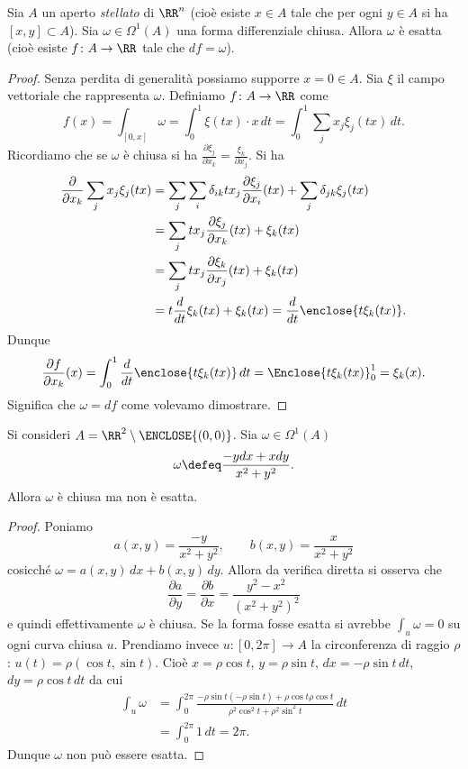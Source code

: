 \begin{theorem}
    \label{th:lemma-poincare}
Sia $A$ un aperto \emph{stellato} di $\RR^n$
(cioè esiste $x\in A$ tale che per ogni $y\in A$ si ha $[x,y]\subset A$). 
Sia $\omega\in \Omega^1(A)$ una forma differenziale chiusa.
Allora $\omega$ è esatta 
(cioè esiste $f\colon A\to \RR$ tale che $df = \omega$).
\end{theorem}
%
\begin{proof}
Senza perdita di generalità possiamo supporre $x=0 \in A$.
Sia $\xi$ il campo vettoriale che rappresenta $\omega$.
Definiamo $f\colon A\to\RR$ come
\[
   f(x) = \int_{[0,x]} \omega = \int_0^1 \xi(tx)\cdot x\, dt 
   = \int_0^1 \sum_j x_j \xi_j(tx) \, dt.
\]
Ricordiamo che se $\omega$ è chiusa si ha $\frac{\partial \xi_j}{\partial x_k} = \frac{\xi_k}{\partial x_j}$.
Si ha 
\begin{align*}
 \frac{\partial}
 {\partial x_k}\sum_j x_j \xi_j(tx)
 &=  \sum_j \sum_i \delta_{ik} t x_j \frac{\partial \xi_j}{\partial x_i}(tx)
    + \sum_j \delta_{jk} \xi_j(tx)\\
 &= \sum_j t x_j \frac{\partial \xi_j}{\partial x_k}(tx) + \xi_k(tx)\\
 &= \sum_j t x_j \frac{\partial \xi_k}{\partial x_j}(tx) + \xi_k(tx)\\
 &= t \frac{d}{dt} \xi_k(tx) + \xi_k(tx) 
  = \frac{d}{dt} \enclose{t \xi_k(tx)}. 
\end{align*}
Dunque 
\[
 \frac{\partial f}{\partial x_k}(x) = \int_0^1 \frac{d}{dt} \enclose{t\xi_k(tx)}\, dt 
 = \Enclose{t\xi_k(tx)}_0^1 = \xi_k(x).
\]
Significa che $\omega = df$ come volevamo dimostrare.
\end{proof}


\begin{example}
Si consideri $A=\RR^2\setminus\ENCLOSE{(0,0)}$.
Sia $\omega\in \Omega^1(A)$ 
\[
\omega \defeq \frac{- y dx + x dy}{x^2+y^2}.
\]
Allora $\omega$ è chiusa ma non è esatta.
\end{example}
\begin{proof}
Poniamo
\[
a(x,y) = \frac{-y}{x^2+y^2},
\qquad 
b(x,y) = \frac{x}{x^2+y^2}
\]
cosicché $\omega = a(x,y)\,dx + b(x,y)\,dy$.
Allora da verifica diretta si osserva che 
\[
 \frac{\partial a}{\partial y} =
 \frac{\partial b}{\partial x} =
 \frac{y^2 - x^2}{(x^2+y^2)^2}
\]
e quindi effettivamente $\omega$ è chiusa.
Se la forma fosse esatta si avrebbe $\int_u \omega=0$ 
su ogni curva chiusa $u$.
Prendiamo invece $u\colon [0,2\pi]\to A$ la circonferenza
di raggio $\rho$:
$u(t) = \rho (\cos t,\sin t)$.
Cioè $x=\rho \cos t$, $y=\rho \sin t$, 
$dx = -\rho \sin t\,dt$, $dy=\rho \cos t\,dt$
da cui
\begin{align*}
\int_u \omega 
&= \int_0^{2\pi} \frac{-\rho \sin t (-\rho \sin t) + \rho \cos t \rho \cos t}{\rho^2\cos^2 t + \rho^2 \sin^2 t} \, dt\\
&= \int_0^{2\pi} 1\, dt = 2\pi. 
\end{align*}
Dunque $\omega$ non può essere esatta.
\end{proof}

